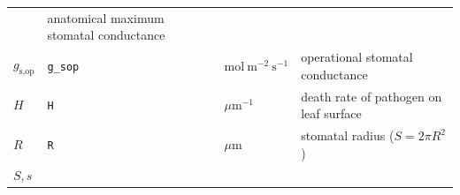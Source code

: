 \documentclass[utf8]{frontiersSCNS}
\begin{document}
\begin{longtable}[]{@{}llll@{}}
\begin{minipage}[t]{0.09\columnwidth}
\end{minipage} & \begin{minipage}[t]{0.61\columnwidth}\raggedright
anatomical maximum stomatal conductance\strut
\end{minipage}\tabularnewline
\begin{minipage}[t]{0.09\columnwidth}\raggedright
\(g_\text{s,op}\)\strut
\end{minipage} & \begin{minipage}[t]{0.09\columnwidth}\raggedright
\texttt{g\_sop}\strut
\end{minipage} & \begin{minipage}[t]{0.09\columnwidth}\raggedright
\(\text{mol}~\text{m}^{-2}~\text{s}^{-1}\)\strut
\end{minipage} & \begin{minipage}[t]{0.61\columnwidth}\raggedright
operational stomatal conductance\strut
\end{minipage}\tabularnewline
\begin{minipage}[t]{0.09\columnwidth}\raggedright
\(H\)\strut
\end{minipage} & \begin{minipage}[t]{0.09\columnwidth}\raggedright
\texttt{H}\strut
\end{minipage} & \begin{minipage}[t]{0.09\columnwidth}\raggedright
\(\mu\textrm{m} ^{-1}\)\strut
\end{minipage} & \begin{minipage}[t]{0.61\columnwidth}\raggedright
death rate of pathogen on leaf surface\strut
\end{minipage}\tabularnewline
\begin{minipage}[t]{0.09\columnwidth}\raggedright
\(R\)\strut
\end{minipage} & \begin{minipage}[t]{0.09\columnwidth}\raggedright
\texttt{R}\strut
\end{minipage} & \begin{minipage}[t]{0.09\columnwidth}\raggedright
\(\mu\textrm{m}\)\strut
\end{minipage} & \begin{minipage}[t]{0.61\columnwidth}\raggedright
stomatal radius (\(S = 2 \pi R ^ 2\))\strut
\end{minipage}\tabularnewline
\begin{minipage}[t]{0.09\columnwidth}\raggedright
\(S,s\)\strut
\end{minipage} & \begin{minipage}[t]{0.09\columnwidth}\raggedright

\end{minipage}
\end{longtable}
\end{document}
